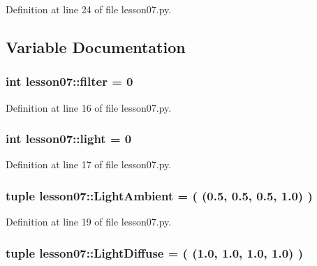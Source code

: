 Definition at line 24 of file lesson07.py.

\subsection{Variable Documentation}
\subsubsection{\setlength{\rightskip}{0pt plus 5cm}int {\bf lesson07::filter} = 0\hspace{0.3cm}{\tt  [static]}}\label{namespacelesson07_6facdf0ef3764571e3240f784a6cf151}




Definition at line 16 of file lesson07.py.
\subsubsection{\setlength{\rightskip}{0pt plus 5cm}int {\bf lesson07::light} = 0\hspace{0.3cm}{\tt  [static]}}\label{namespacelesson07_3d1bdf79a3b01c9b3310168859da5ac0}




Definition at line 17 of file lesson07.py.
\subsubsection{\setlength{\rightskip}{0pt plus 5cm}tuple {\bf lesson07::LightAmbient} = ( (0.5, 0.5, 0.5, 1.0) )\hspace{0.3cm}{\tt  [static]}}\label{namespacelesson07_aca8b188d536f38f7e990d848650f0cc}




Definition at line 19 of file lesson07.py.
\subsubsection{\setlength{\rightskip}{0pt plus 5cm}tuple {\bf lesson07::LightDiffuse} = ( (1.0, 1.0, 1.0, 1.0) )\hspace{0.3cm}{\tt  [static]}}\label{namespacelesson07_bc8671aefb0aa54f456f95a41647f5e1}




